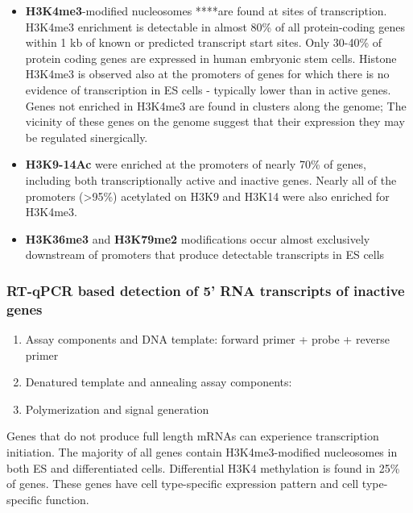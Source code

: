 \begin{itemize}
\tightlist
\item
  \textbf{H3K4me3}-modified nucleosomes ****are found at sites of transcription. H3K4me3 enrichment is detectable in almost 80\% of all protein-coding genes within 1 kb of known or predicted transcript start sites. Only 30-40\% of protein coding genes are expressed in human embryonic stem cells. Histone H3K4me3 is observed also at the promoters of genes for which there is no evidence of transcription in ES cells - typically lower than in active genes. Genes not enriched in H3K4me3 are found in clusters along the genome; The vicinity of these genes on the genome suggest that their expression they may be regulated sinergically.
\item
  \textbf{H3K9-14Ac} were enriched at the promoters of nearly 70\% of genes, including both transcriptionally active and inactive genes. Nearly all of the promoters (\textgreater95\%) acetylated on H3K9 and H3K14 were also enriched for H3K4me3.
\item
  \textbf{H3K36me3} and \textbf{H3K79me2} modifications occur almost exclusively downstream of promoters that produce detectable transcripts in ES cells
\end{itemize}

\hypertarget{rt-qpcr-based-detection-of-5-rna-transcripts-of-inactive-genes}{%
\subsubsection{RT-qPCR based detection of 5' RNA transcripts of inactive genes}\label{rt-qpcr-based-detection-of-5-rna-transcripts-of-inactive-genes}}

\begin{enumerate}
\def\labelenumi{\arabic{enumi}.}
\tightlist
\item
  Assay components and DNA template: forward primer + probe + reverse primer
\item
  Denatured template and annealing assay components:
\item
  Polymerization and signal generation
\end{enumerate}

Genes that do not produce full length mRNAs can experience transcription initiation. The majority of all genes contain H3K4me3-modified nucleosomes in both ES and differentiated cells. Differential H3K4 methylation is found in 25\% of genes. These genes have cell type-specific expression pattern and cell type-specific function.

